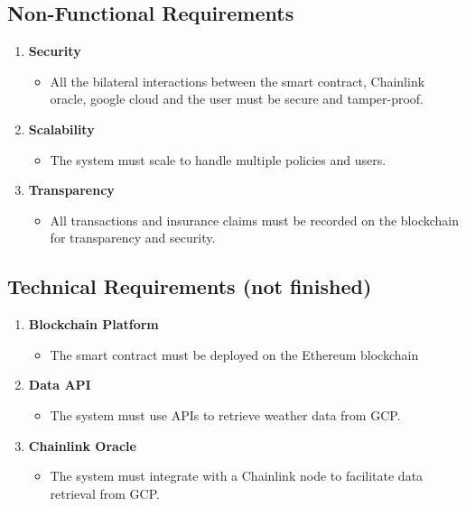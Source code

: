 \subsection{Non-Functional Requirements}

\begin{enumerate}
    \item \textbf{Security}
    \begin{itemize}
        \item All the bilateral interactions between the smart contract, Chainlink oracle, google cloud and the user must be secure and tamper-proof.
    \end{itemize}
    
    \item \textbf{Scalability}
    \begin{itemize}
        \item The system must scale to handle multiple policies and users.
    \end{itemize}
    
    \item \textbf{Transparency}
    \begin{itemize}
        \item All transactions and insurance claims must be recorded on the blockchain for transparency and security.
    \end{itemize}
\end{enumerate}

\subsection{Technical Requirements (not finished)}

\begin{enumerate}
    \item \textbf{Blockchain Platform}
    \begin{itemize}
        \item The smart contract must be deployed on the Ethereum blockchain
    \end{itemize}
    
    \item \textbf{Data API}
    \begin{itemize}
        \item The system must use APIs to retrieve weather data from GCP.
    \end{itemize}
    
    \item \textbf{Chainlink Oracle}
    \begin{itemize}
        \item The system must integrate with a Chainlink node to facilitate data retrieval from GCP.
    \end{itemize}
\end{enumerate}

